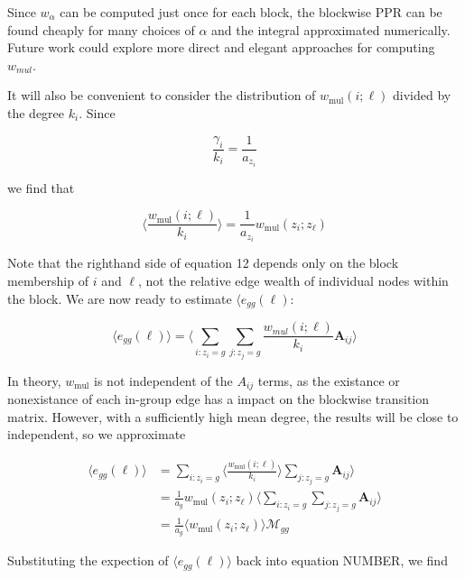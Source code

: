 \documentclass[12pt]{article}
\begin{document}
Since $w_\alpha$ can be computed just once for each block, the blockwise PPR can be found cheaply for many choices of $\alpha$ and the integral approximated numerically.  Future work could explore more direct and elegant approaches for computing $w_{mul}$. 

It will also be convenient to consider the distribution of $w_\text{mul}(i;\ell)$ divided by the degree $k_i$.  Since

\begin{equation}
  \frac{\gamma_i}{k_i} = \frac{1}{a_{z_i}}
\end{equation}

we find that 

\begin{equation}
  \big \langle \frac{w_\text{mul}(i;\ell)}{k_i} \big \rangle = \frac{1}{a_{z_i}} w_\text{mul}(z_i ;z_\ell)
\end{equation}

Note that the righthand side of equation 12 depends only on the block membership of $i$ and $\ell$, not the relative edge wealth of individual nodes within the block.  We are now ready to estimate $\langle e_{gg}(\ell)$:

\begin{equation}
  \langle e_{gg}(\ell) \rangle = \langle \sum_{i:z_i = g} \sum_{j: z_j = g} \frac{w_{mul}(i;\ell)}{k_i} \mathbf{A}_{ij}\rangle
\end{equation}

In theory, $w_\text{mul}$ is not independent of the $A_{ij}$ terms, as the existance or nonexistance of each in-group edge has a impact on the blockwise transition matrix.  However, with a sufficiently high mean degree, the results will be close to independent, so we approximate

\begin{equation}
  \begin{aligned}
    \langle e_{gg}(\ell) \rangle &=  \sum_{i: z_i = g} \langle \frac{w_\text{mul}(i; \ell)}{k_i} \rangle \sum_{j: z_j = g}  \mathbf{A}_{ij} \big \rangle \\
    &=  \frac{1}{a_g} w_\text{mul}(z_i; z_\ell) \big \langle \sum_{i: z_i = g}  \sum_{j: z_j = g}  \mathbf{A}_{ij} \big \rangle \\
    &= \frac{1}{a_g} \langle w_\text{mul}(z_i; z_\ell) \rangle \mathcal{M}_{gg}
  \end{aligned}
\end{equation}

Substituting the expection of $\langle e_{gg}(\ell)\rangle$ back into equation NUMBER, we find
\end{document}
